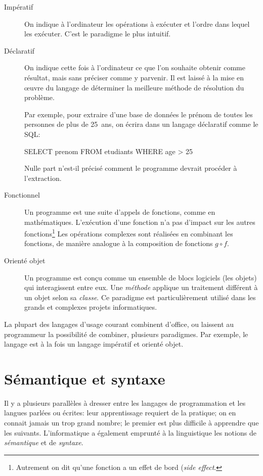 \begin{description}
\item[Impératif] On indique à l'ordinateur les opérations à exécuter
  et l'ordre dans lequel les exécuter. C'est le paradigme le plus
  intuitif.
\item[Déclaratif] On indique cette fois à l'ordinateur ce que l'on
  souhaite obtenir comme résultat, mais sans préciser comme y
  parvenir. Il est laissé à la mise en œuvre du langage de déterminer
  la meilleure méthode de résolution du problème.

  Par exemple, pour extraire d'une base de données  le
  prénom de toutes les personnes de plus de 25~ans, on écrira dans un
  langage déclaratif comme le SQL:
\begin{Schunk}
\begin{Sinput}
SELECT prenom FROM etudiants WHERE age > 25
\end{Sinput}
\end{Schunk}
  Nulle part n'est-il précisé comment le programme devrait procéder à
  l'extraction.
\item[Fonctionnel] Un programme est une suite d'appels de fonctions,
  comme en mathématiques. L'exécution d'une fonction n'a pas d'impact
  sur les autres fonctions\footnote{%
    Autrement on dit qu'une fonction a un effet de bord (\emph{side
      effect}.} %
  Les opérations complexes sont réalisées en combinant les fonctions,
  de manière analogue à la composition de fonctions $g \circ f$.
\item[Orienté objet] Un programme est conçu comme un ensemble de blocs
  logiciels (les objets) qui interagissent entre eux. Une
  \emph{méthode} applique un traitement différent à un objet
  selon sa \emph{classe}. Ce paradigme est particulièrement utilisé
  dans les grands et complexes projets informatiques.
\end{description}

La plupart des langages d'usage courant combinent d'office, ou
laissent au programmeur la possibilité de combiner, plusieurs
paradigmes. Par exemple, le langage {\Cpp} est à la fois un langage
impératif et orienté objet.


\section{Sémantique et syntaxe}
\label{sec:informatique:semantique}

Il y a plusieurs parallèles à dresser entre les langages de
programmation et les langues parlées ou écrites: leur apprentissage
requiert de la pratique; on en connait jamais un trop grand nombre; le
premier est plus difficile à apprendre que les suivants.
L'informatique a également emprunté à la linguistique les notions de
\emph{sémantique} et de \emph{syntaxe}.


